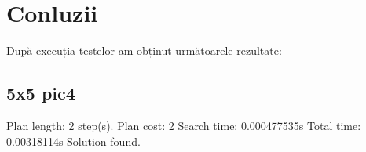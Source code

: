 \section{Conluzii}
După execuția testelor am obținut următoarele rezultate:\newline
\newline
\subsection{5x5 pic4} \newline
\newline
[t=0.00318114s, 10292 KB] Plan length: 2 step(s).
\newline
[t=0.00318114s, 10292 KB] Plan cost: 2
\newline
[t=0.00318114s, 10292 KB] Search time: 0.000477535s
\newline
[t=0.00318114s, 10292 KB] Total time: 0.00318114s
\newline
Solution found.
\newline
